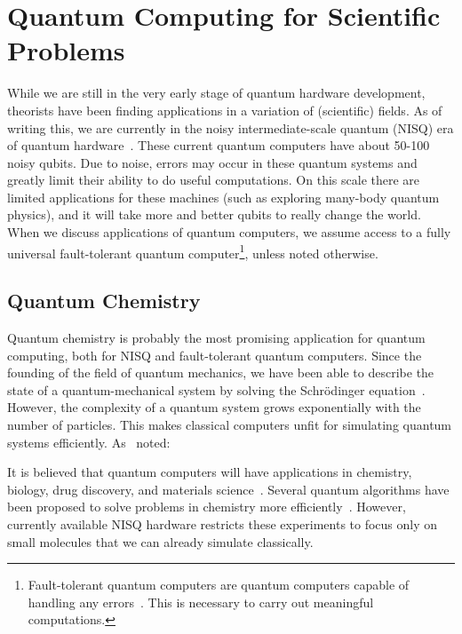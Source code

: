 \documentclass[twocolumn, switch]{article}
\begin{document}
    \section{Quantum Computing for Scientific Problems} \label{sec:quantum-science}
    While we are still in the very early stage of quantum hardware development, theorists have been finding applications in a variation of (scientific) fields.
    As of writing this, we are currently in the noisy intermediate-scale quantum (NISQ) era of quantum hardware~\cite{preskill2018quantum}.
    These current quantum computers have about 50-100 noisy qubits.
    Due to noise, errors may occur in these quantum systems and greatly limit their ability to do useful computations.
    On this scale there are limited applications for these machines (such as exploring many-body quantum physics), and it will take more and better qubits to really change the world.
    When we discuss applications of quantum computers, we assume access to a fully universal fault-tolerant quantum computer\footnote{Fault-tolerant quantum computers are quantum computers capable of handling any errors~\cite{oud2019introduction}. This is necessary to carry out meaningful computations.}, unless noted otherwise.
    
    \subsection{Quantum Chemistry}
    Quantum chemistry is probably the most promising application for quantum computing, both for NISQ and fault-tolerant quantum computers.
    Since the founding of the field of quantum mechanics, we have been able to describe the state of a quantum-mechanical system by solving the Schr{\"o}dinger equation~\cite{griffiths2018introduction}.
    However, the complexity of a quantum system grows exponentially with the number of particles.
    This makes classical computers unfit for simulating quantum systems efficiently.
    As~\textcite{dirac1929quantum} noted: 

    It is believed that quantum computers will have applications in chemistry, biology, drug discovery, and materials science~\cite{mcardle2018quantum}.
    Several quantum algorithms have been proposed to solve problems in chemistry more efficiently~\cite{lidar1999calculating, kassal2008polynomial, aspuru2005simulated, vqe}.
    However, currently available NISQ hardware restricts these experiments to focus only on small molecules that we can already simulate classically.
    
\end{document}
